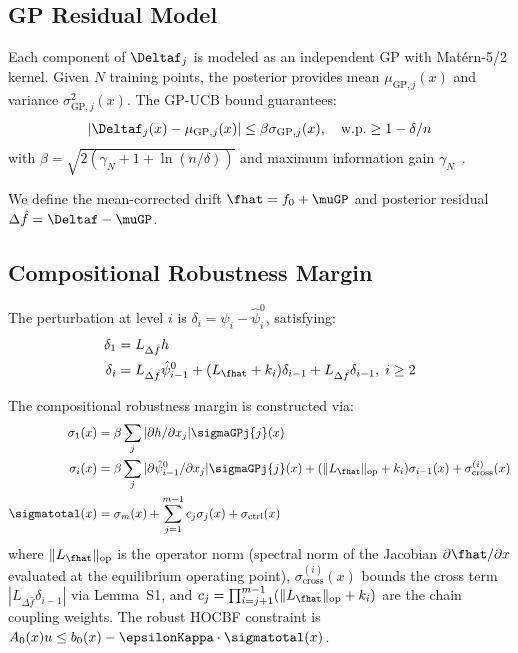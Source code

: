 \subsection{GP Residual Model}

Each component of $\Deltaf_j$ is modeled as an independent GP with Mat\'{e}rn-5/2 kernel. Given $N$ training points, the posterior provides mean $\mu_{\mathrm{GP},j}(x)$ and variance $\sigma_{\mathrm{GP},j}^2(x)$. The GP-UCB bound guarantees:
\begin{equation}
    |\Deltaf_j(x) - \mu_{\mathrm{GP},j}(x)| \leq \beta \sigma_{\mathrm{GP},j}(x), \quad \text{w.p.} \geq 1-\delta/n
    \label{eq:gp_bound}
\end{equation}
with $\beta = \sqrt{2(\gamma_N + 1 + \ln(n/\delta))}$ and maximum information gain $\gamma_N$~\cite{srinivas2010gp}.

We define the mean-corrected drift $\fhat = f_0 + \muGP$ and posterior residual $\Delta \hat{f} = \Deltaf - \muGP$.

\subsection{Compositional Robustness Margin}

The perturbation at level $i$ is $\delta_i = \psi_i - \hat{\psi}_i^0$, satisfying:
\begin{align}
    \delta_1 &= L_{\Delta\hat{f}}h \label{eq:d1}\\
    \delta_i &= L_{\Delta\hat{f}}\hat{\psi}_{i-1}^0 + (L_{\fhat}+k_i)\delta_{i-1} + L_{\Delta\hat{f}}\delta_{i-1}, \; i\geq 2 \label{eq:di}
\end{align}

The compositional robustness margin is constructed via:
\begin{align}
    \sigma_1(x) &= \beta \sum_j |\partial h/\partial x_j| \sigmaGPj{j}(x) \label{eq:s1}\\
    \sigma_i(x) &= \beta \sum_j |\partial \hat{\psi}_{i-1}^0/\partial x_j| \sigmaGPj{j}(x) + (\|L_{\fhat}\|_{\mathrm{op}} + k_i)\sigma_{i-1}(x) + \sigma_{\mathrm{cross}}^{(i)}(x) \label{eq:si}\\
    \sigmatotal(x) &= \sigma_m(x) + \sum_{j=1}^{m-1} c_j\sigma_j(x) + \sigma_{\mathrm{ctrl}}(x) \label{eq:st}
\end{align}
where $\|L_{\fhat}\|_{\mathrm{op}}$ is the operator norm (spectral norm of the Jacobian $\partial \fhat / \partial x$ evaluated at the equilibrium operating point), $\sigma_{\mathrm{cross}}^{(i)}(x)$ bounds the cross term $|L_{\Delta\hat{f}}\delta_{i-1}|$ via Lemma~S1, and $c_j = \prod_{i=j+1}^{m-1} (\|L_{\fhat}\|_{\mathrm{op}} + k_i)$ are the chain coupling weights. The robust HOCBF constraint is $A_0(x)u \leq b_0(x) - \epsilonKappa\cdot\sigmatotal(x)$.

